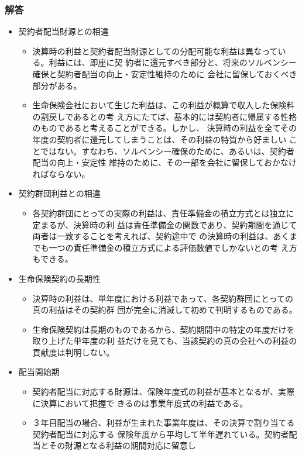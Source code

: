 \documentclass[report,gutter=10mm,fore-edge=10mm,uplatex,dvipdfmx]{jlreq}
\begin{document}
\subsubsection{解答}
\begin{itemize}
 \item 契約者配当財源との相違
\begin{itemize}
 \item  決算時の利益と契約者配当財源としての分配可能な利益は異なっている。利益には、即座に契
 約者に還元すべき部分と、将来のソルベンシー確保と契約者配当の向上・安定性維持のために
 会社に留保しておくべき部分がある。
\item  生命保険会社において生じた利益は、この利益が概算で収入した保険料の割戻しであるとの考
 え方にたてば、基本的には契約者に帰属する性格のものであると考えることができる。しかし、
 決算時の利益を全てその年度の契約者に還元してしまうことは、その利益の特質から好ましい
 ことではない。すなわち、ソルベンシー確保のために、あるいは、契約者配当の向上・安定性
 維持のために、その一部を会社に留保しておかなければならない。
\end{itemize} 
\item 契約群団利益との相違
\begin{itemize}
 \item  各契約群団にとっての実際の利益は、責任準備金の積立方式とは独立に定まるが、決算時の利
 益は責任準備金の関数であり、契約期間を通じて両者は一致することを考えれば、契約途中で
 の決算時の利益は、あくまでも一つの責任準備金の積立方式による評価数値でしかないとの考
 え方もできる。
\end{itemize} 
\item 生命保険契約の長期性
\begin{itemize}
 \item  決算時の利益は、単年度における利益であって、各契約群団にとっての真の利益はその契約群
 団が完全に消滅して初めて判明するものである。
\item  生命保険契約は長期のものであるから、契約期間中の特定の年度だけを取り上げた単年度の利
 益だけを見ても、当該契約の真の会社への利益の貢献度は判明しない。
\end{itemize} 
\item 配当開始期
\begin{itemize}
 \item  契約者配当に対応する財源は、保険年度式の利益が基本となるが、実際に決算において把握で
 きるのは事業年度式の利益である。
\item  ３年目配当の場合、利益が生まれた事業年度は、その決算で割り当てる契約者配当に対応する
 保険年度から平均して半年遅れている。契約者配当とその財源となる利益の期間対応に留意し

\end{itemize}
\end{itemize}
\end{document}
